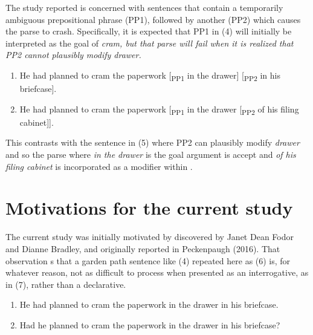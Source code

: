 \documentclass[12pt,oneside]{book}
\begin{document}
The study  reported  is concerned with  sentences that contain a temporarily ambiguous prepositional phrase (PP1), followed by another (PP2) which causes the  parse to crash. Specifically, it is expected that PP1 in  (4) will initially be interpreted as the goal of \em{cram}, but that parse will fail when it is realized that PP2  cannot plausibly modify \em{drawer}. 

\begin{enumerate}
\def\labelenumi{(\arabic{enumi})}
\setcounter{enumi}{3}
\item
  He had planned to cram the paperwork {[}\textsubscript{PP1} in the drawer{]} {[}\textsubscript{PP2} in his briefcase{]}.
\item
  He had planned to cram the paperwork {[}\textsubscript{PP1} in the drawer {[}\textsubscript{PP2} of his filing cabinet{]}{]}.
\end{enumerate}

This contrasts with the  sentence in (5)\added{,} where PP2 can plausibly modify \emph{drawer} and so the parse where  \emph{in the drawer} is the goal argument is accept and \emph{of his filing cabinet} is incorporated as a modifier within .

\hypertarget{obs}{%
\section{Motivations for the current study}\label{obs}}

The current study was initially motivated by  discovered by Janet Dean Fodor and Dianne Bradley, and originally reported in Peckenpaugh (2016). That observation s that a garden path sentence like (4) repeated here as (6) is, for whatever reason, not as difficult to process when presented as an interrogative, as in (7), rather than a declarative.

\begin{enumerate}
\def\labelenumi{(\arabic{enumi})}
\setcounter{enumi}{5}
\item
  He had planned to cram the paperwork \deleted{[~PP1~} in the drawer\deleted{] [~PP2~} in his briefcase\deleted{]}.
\item
  Had he planned to cram the paperwork \deleted{[~PP1~} in the drawer\deleted{] [~PP2~} in his briefcase\deleted{]}?
\end{enumerate}
\end{document}
